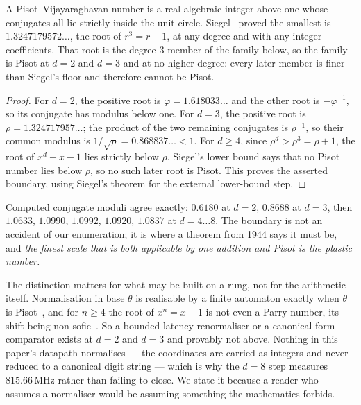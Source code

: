 \begin{theorem}\label{thm:siegel}
A Pisot--Vijayaraghavan number is a real algebraic integer above one whose
conjugates all lie strictly inside the unit circle. Siegel~\cite{siegel1944}
proved the smallest is $1.3247179572\ldots$, the root of $r^3=r+1$, at any
degree and with any integer coefficients. That root is the degree-3 member of
the family below, so the family is Pisot at $d=2$ and $d=3$ and at no higher
degree: every later member is finer than Siegel's floor and therefore cannot be
Pisot.
\end{theorem}
\begin{proof}
For $d=2$, the positive root is $\varphi=1.618033\ldots$ and the other root is
$-\varphi^{-1}$, so its conjugate has modulus below one. For $d=3$, the
positive root is $\rho=1.324717957\ldots$; the product of the two remaining
conjugates is $\rho^{-1}$, so their common modulus is
$1/\sqrt{\rho}=0.868837\ldots<1$. For $d\ge4$, since
$\rho^d>\rho^3=\rho+1$, the root of $x^d-x-1$ lies strictly below $\rho$.
Siegel's lower bound says that no Pisot number lies below $\rho$, so no such
later root is Pisot. This proves the asserted boundary, using Siegel's theorem
for the external lower-bound step.
\end{proof}

Computed conjugate moduli agree exactly: $0.6180$ at $d=2$, $0.8688$ at $d=3$,
then $1.0633$, $1.0990$, $1.0992$, $1.0920$, $1.0837$ at $d=4\ldots8$. The
boundary is not an accident of our enumeration; it is where a theorem from 1944
says it must be, and \emph{the finest scale that is both applicable by one
addition and Pisot is the plastic number.}

The distinction matters for what may be built on a rung, not for the arithmetic
itself. Normalisation in base $\theta$ is realisable by a finite automaton
exactly when $\theta$ is Pisot~\cite{berend1994}, and for $n\ge4$ the root of
$x^n = x+1$ is not even a Parry number, its shift being
non-sofic~\cite{akiyama2016}. So a bounded-latency renormaliser or a
canonical-form comparator exists at $d=2$ and $d=3$ and provably not above.
Nothing in this paper's datapath normalises --- the coordinates are carried as
integers and never reduced to a canonical digit string --- which is why the
$d=8$ step measures $815.66$\,MHz rather than failing to close. We state it
because a reader who assumes a normaliser would be assuming something the
mathematics forbids.

